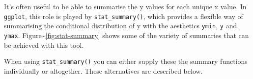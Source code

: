 It's often useful to be able to summarise the y values for each unique x
value. In \texttt{ggplot}, this role is played by
\texttt{stat\_summary()}, which provides a flexible way of summarising
the conditional distribution of y with the aesthetics \texttt{ymin},
\texttt{y} and \texttt{ymax}.
Figure\textasciitilde{}\ref{fig:stat-summary} shows some of the variety
of summaries that can be achieved with this tool.
  

When using \texttt{stat\_summary()} you can either supply these the
summary functions individually or altogether. These alternatives are
described below.

\begin{Shaded}
\begin{Highlighting}[]
\StringTok{ }
\StringTok{ }\NormalTok{(} \NormalTok{, } \NormalTok{)}
\StringTok{ }\NormalTok{(} \NormalTok{, } \NormalTok{)}
\StringTok{ }\NormalTok{(} \NormalTok{, } \NormalTok{)}
\StringTok{ }\NormalTok{(} \NormalTok{, } \NormalTok{)}
\StringTok{ }\NormalTok{(}
\StringTok{ }\NormalTok{(} \NormalTok{, } \NormalTok{)}
\StringTok{ }\NormalTok{(} \NormalTok{, } \NormalTok{)}
\StringTok{ }\NormalTok{(} \NormalTok{, } \NormalTok{)}
\StringTok{ }\NormalTok{(} \NormalTok{, } \NormalTok{)}
\end{Highlighting}
\end{Shaded}

